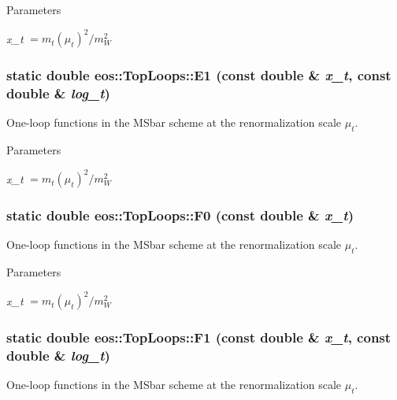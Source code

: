 \begin{DoxyParams}{Parameters}
\item[{\em x\_\-t}]$= m_t(\mu_t)^2 / m_W^2$ \end{DoxyParams}
\hypertarget{structeos_1_1TopLoops_a3ba9681fd4cad44013150a061e2391db}{
\subsubsection[{E1}]{\setlength{\rightskip}{0pt plus 5cm}static double eos::TopLoops::E1 (const double \& {\em x\_\-t}, \/  const double \& {\em log\_\-t})}}
\label{structeos_1_1TopLoops_a3ba9681fd4cad44013150a061e2391db}
One-\/loop functions in the MSbar scheme at the renormalization scale $\mu_t$.


\begin{DoxyParams}{Parameters}
\item[{\em x\_\-t}]$= m_t(\mu_t)^2 / m_W^2$ \end{DoxyParams}
\hypertarget{structeos_1_1TopLoops_a9c2ef545d78afbc1d564ec5528032b4c}{
\subsubsection[{F0}]{\setlength{\rightskip}{0pt plus 5cm}static double eos::TopLoops::F0 (const double \& {\em x\_\-t})}}
\label{structeos_1_1TopLoops_a9c2ef545d78afbc1d564ec5528032b4c}
One-\/loop functions in the MSbar scheme at the renormalization scale $\mu_t$.


\begin{DoxyParams}{Parameters}
\item[{\em x\_\-t}]$= m_t(\mu_t)^2 / m_W^2$ \end{DoxyParams}
\hypertarget{structeos_1_1TopLoops_a11d3bd501d8533b6c864cd8f7a117386}{
\subsubsection[{F1}]{\setlength{\rightskip}{0pt plus 5cm}static double eos::TopLoops::F1 (const double \& {\em x\_\-t}, \/  const double \& {\em log\_\-t})}}
\label{structeos_1_1TopLoops_a11d3bd501d8533b6c864cd8f7a117386}
One-\/loop functions in the MSbar scheme at the renormalization scale $\mu_t$.


